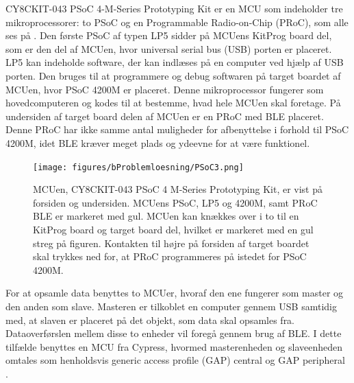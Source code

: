 CY8CKIT-043 PSoC 4-M-Series Prototyping Kit er en MCU som indeholder tre mikroprocessorer: to PSoC og en Programmable Radio-on-Chip (PRoC), som alle ses på . Den første PSoC af typen LP5 sidder på MCUens KitProg board del, som er den del af MCUen, hvor universal serial bus (USB) porten er placeret. LP5 kan indeholde software, der kan indlæses på en computer ved hjælp af USB porten. Den bruges til at programmere og debug softwaren på target boardet af MCUen, hvor PSoC 4200M er placeret. %
Denne mikroprocessor fungerer som hovedcomputeren og kodes til at bestemme, hvad hele MCUen skal foretage. %
På undersiden af target board delen af MCUen er en PRoC med BLE placeret. Denne PRoC har ikke samme antal muligheder for afbenyttelse i forhold til PSoC 4200M, idet BLE kræver meget plads og ydeevne for at være funktionel. \citep{CYPRESS2016PSoC,Semiconductor2016,CYPRESS2016Cortexm0}
\begin{figure}[H]
	\centering
	\texttt{[image: figures/bProblemloesning/PSoC3.png]}
	\caption{MCUen, CY8CKIT-043 PSoC 4 M-Series Prototyping Kit, er vist på forsiden og undersiden. MCUens PSoC, LP5 og 4200M, samt PRoC BLE er markeret med gul. MCUen kan knækkes over i to til en KitProg board og target board del, hvilket er markeret med en gul streg på figuren. Kontakten til højre på forsiden af target boardet skal trykkes ned for, at PRoC programmeres på istedet for PSoC 4200M. \citep{CYPRESS2016PSoC,Semiconductor2016}}
	\label{fig:PSoC}
\end{figure}\vspace{-0.2cm}
For at opsamle data benyttes to MCUer, hvoraf den ene fungerer som master og den anden som slave. Masteren er tilkoblet en computer gennem USB samtidig med, at slaven er placeret på det objekt, som data skal opsamles fra. Dataoverførslen mellem disse to enheder vil foregå gennem brug af BLE. I dette tilfælde benyttes en MCU fra Cypress, hvormed masterenheden og slaveenheden omtales som henholdsvis generic access profile (GAP) central og GAP peripheral \citep{Luthra2015}.

